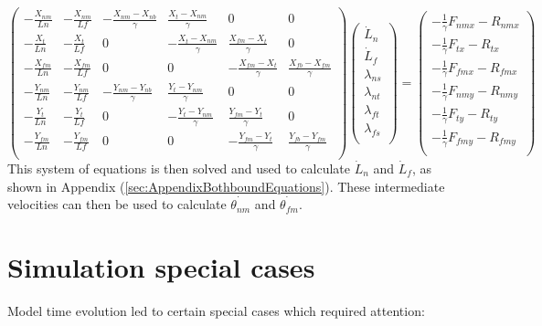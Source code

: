 \documentclass[9pt,twoside,lineno]{pnas-new}
\begin{document}
\[
\begin{pmatrix}
  -\frac{X_{nm}}{Ln} & -\frac{X_{nm}}{Lf}
  & -\frac{X_{nm}-X_{nb}}{\gamma} & \frac{X_{t}-X_{nm}}{\gamma} & 0 & 0\\
  -\frac{X_{t}}{Ln} & -\frac{X_{t}}{Lf}
  & 0 & -\frac{X_{t}-X_{nm}}{\gamma} & \frac{X_{fm}-X_{t}}{\gamma} & 0\\
  -\frac{X_{fm}}{Ln} & -\frac{X_{fm}}{Lf}
  & 0 & 0 & -\frac{X_{fm}-X_{t}}{\gamma} & \frac{X_{fb}-X_{fm}}{\gamma}\\
  -\frac{Y_{nm}}{Ln} & -\frac{Y_{nm}}{Lf}
  & -\frac{Y_{nm}-Y_{nb}}{\gamma} & \frac{Y_{t}-Y_{nm}}{\gamma} & 0 & 0\\
  -\frac{Y_{t}}{Ln} & -\frac{Y_{t}}{Lf}
  & 0 & -\frac{Y_{t}-Y_{nm}}{\gamma} & \frac{Y_{fm}-Y_{t}}{\gamma} & 0\\
  -\frac{Y_{fm}}{Ln} & -\frac{Y_{fm}}{Lf}
  & 0 & 0 & -\frac{Y_{fm}-Y_{t}}{\gamma} & \frac{Y_{fb}-Y_{fm}}{\gamma}\\
\end{pmatrix}
\begin{pmatrix}
  \dot{L}_n\\
  \dot{L}_f\\
  \lambda_{ns}\\
  \lambda_{nt}\\
  \lambda_{ft}\\
  \lambda_{fs}\\
\end{pmatrix}
=
\begin{pmatrix}
  -\frac{1}{\gamma}F_{nmx} - R_{nmx}\\
  -\frac{1}{\gamma}F_{tx}  - R_{tx}\\
  -\frac{1}{\gamma}F_{fmx} - R_{fmx}\\
  -\frac{1}{\gamma}F_{nmy} - R_{nmy}\\
  -\frac{1}{\gamma}F_{ty}  - R_{ty}\\
  -\frac{1}{\gamma}F_{fmy} - R_{fmy}\\
\end{pmatrix}
\]
%
This system of equations is then solved and used to calculate $\dot{L}_n$ and $\dot{L}_f$, as shown in Appendix (\ref{sec:AppendixBothboundEquations}). These intermediate velocities can then be used to calculate $\dot{\theta_{nm}}$ and $\dot{\theta_{fm}}$.\\

\section*{Simulation special cases}
Model time evolution led to certain special cases which required attention:\\
\end{document}
